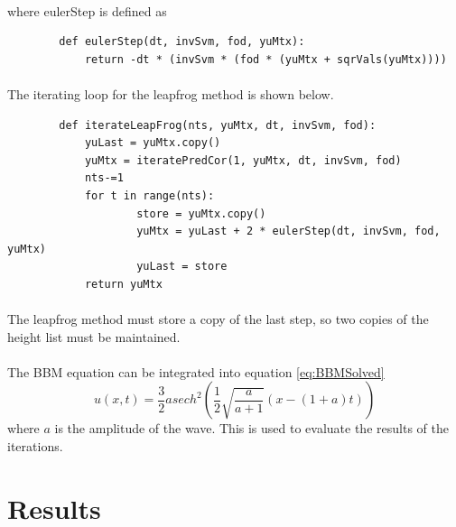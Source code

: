 \documentclass[a4paper,12pt]{article}
\begin{document}
	\paragraph*{}
		where eulerStep is defined as 
		\begin{verbatim}
		def eulerStep(dt, invSvm, fod, yuMtx):
	   		return -dt * (invSvm * (fod * (yuMtx + sqrVals(yuMtx))))

		\end{verbatim}
	\paragraph*{}
		The iterating loop for the leapfrog method is shown below.
		\begin{verbatim}
		def iterateLeapFrog(nts, yuMtx, dt, invSvm, fod):
		   	yuLast = yuMtx.copy()
		   	yuMtx = iteratePredCor(1, yuMtx, dt, invSvm, fod)
		   	nts-=1
		   	for t in range(nts):
		      		store = yuMtx.copy()
			      	yuMtx = yuLast + 2 * eulerStep(dt, invSvm, fod, yuMtx)
			      	yuLast = store
			return yuMtx
		\end{verbatim}
	\paragraph*{}
		The leapfrog method must store a copy of the last step, so two copies of the height list must be maintained. 
	\paragraph*{} 
		The BBM equation can be integrated into equation \ref{eq:BBMSolved}
		\begin{equation}
			\label{eq:BBMSolved}
			u(x, t) = \frac{3}{2}asech^{2}(\frac{1}{2}\sqrt{\frac{a}{a+1}}(x-(1+a)t))
		\end{equation}
		where $a$ is the amplitude of the wave.  This is used to evaluate the results of the iterations.

\section{Results}
\end{document}
